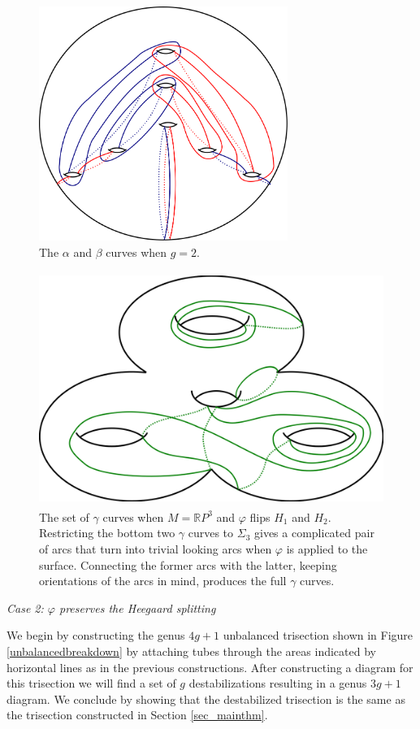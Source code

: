 \documentclass[12pt]{amsart}
\newcommand{\R}{\mathbb{R}}
\theoremstyle{definition}
\theoremstyle{remark}
\begin{document}
\begin{figure}[h]
\centering
\includegraphics[height=3in]{diagrampart1.png}
\caption{The $\alpha$ and $\beta$ curves when $g=2$.}
\label{firsttwocolors}
\end{figure}

\begin{figure}[h]
\centering
\includegraphics[height=3in]{s1rp3_green.png}
\caption{The set of $\gamma$ curves when $M =\R P^3$ and $\varphi$ flips $H_1$ and $H_2$.
Restricting the bottom two $\gamma$ curves to $\Sigma_3$ gives a complicated pair of arcs that turn into trivial looking arcs when $\varphi$ is applied to the surface.
 Connecting the former arcs with the latter, keeping orientations of the arcs in mind, produces the full $\gamma$ curves.}
\label{greenex}
\end{figure}

\smallskip
\noindent\textit{Case 2: $\varphi$ preserves the Heegaard splitting}\ \

We begin by constructing the genus $4g+1$ unbalanced trisection shown in Figure \ref{unbalancedbreakdown} by attaching tubes through the areas indicated by horizontal lines as in the previous constructions.
After constructing a diagram for this trisection we will find a set of $g$ destabilizations resulting in a genus $3g+1$ diagram.
We conclude by showing that the destabilized trisection is the same as the trisection constructed in Section \ref{sec_mainthm}.
\end{document}
